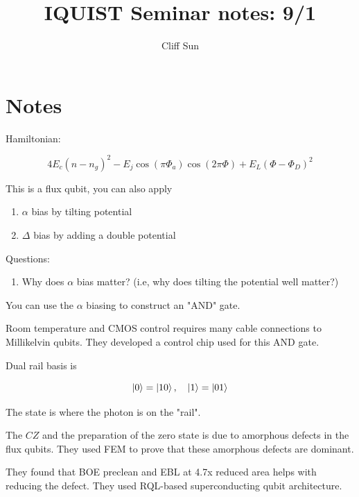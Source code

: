 \documentclass{article}
\title{IQUIST Seminar notes: 9/1}
\author{Cliff Sun}
\newtheorem{one minute paper}[theorem]{One Minute Paper}
\begin{document}
\maketitle


\section*{Notes}

Hamiltonian:

\begin{equation}
    4E_c(n - n_g)^2 - E_j\cos(\pi \Phi_a)\cos(2\pi \Phi) + E_L(\Phi - \Phi_D)^2
\end{equation}

This is a flux qubit, you can also apply  

\begin{enumerate}
    \item $\alpha$ bias by tilting potential
    \item $\Delta$ bias by adding a double potential
\end{enumerate}

Questions:
\begin{enumerate}
    \item Why does $\alpha$ bias matter? (i.e, why does tilting the potential well matter?)
\end{enumerate}

You can use the $\alpha$ biasing to construct an "AND" gate. 

Room temperature and CMOS control requires many cable connections to Millikelvin qubits. They developed a control chip used for this AND gate. 

Dual rail basis is 

\begin{equation}
    \ket{0} = \ket{10}, \quad \ket{1} = \ket{01}
\end{equation}

The state is where the photon is on the "rail". 

The $CZ$ and the preparation of the zero state is due to amorphous defects in the flux qubits. They used FEM to prove that these amorphous defects are dominant. 

They found that BOE preclean and EBL at 4.7x reduced area helps with reducing the defect. They used RQL-based superconducting qubit architecture. 
\end{document}

